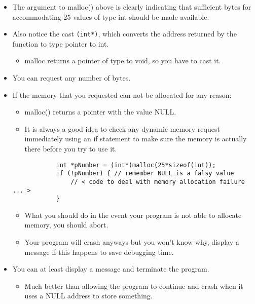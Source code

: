 \begin{itemize}
    \item The argument to malloc() above is clearly indicating that sufficient bytes for accommodating 25 values of type int should be made available.
    \item Also notice the cast \texttt{(int*)}, which converts the address returned by the function to type pointer to int.
        \begin{itemize}
            \item malloc returns a pointer of type to void, so you have to cast it. 
        \end{itemize}
    
    \item You can request any number of bytes.
    \item If the memory that you requested can not be allocated for any reason:
        \begin{itemize}
            \item malloc() returns a pointer with the value NULL. 
            \item It is always a good idea to check any dynamic memory request immediately using an if statement to make sure the memory is actually there before you try to use it. 
        \end{itemize}
        \begin{verbatim}
            int *pNumber = (int*)malloc(25*sizeof(int)); 
            if (!pNumber) { // remember NULL is a falsy value
                // < code to deal with memory allocation failure ... >
            }
        \end{verbatim}
        \begin{itemize}
            \item What you should do in the event your program is not able to allocate memory, you should abort. 
            \item Your program will crash anyways but you won't know why, display a message if this happens to save debugging time. 
        \end{itemize}

    \item You can at least display a message and terminate the program.
        \begin{itemize}
            \item Much better than allowing the program to continue and crash when it uses a NULL address to store something. 
        \end{itemize}
\end{itemize}


